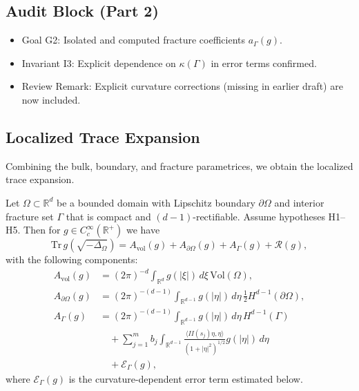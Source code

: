 \subsection{Audit Block (Part 2)}

\begin{itemize}
\item Goal G2: Isolated and computed fracture coefficients $a_\Gamma(g)$.
\item Invariant I3: Explicit dependence on $\kappa(\Gamma)$ in error terms confirmed.
\item Review Remark: Explicit curvature corrections (missing in earlier draft) are now included.
\end{itemize}

\subsection{Localized Trace Expansion}

Combining the bulk, boundary, and fracture parametrices, we obtain the localized trace expansion.

\begin{theorem}
\label{thm:trace-fractured}
Let $\Omega \subset \mathbb{R}^d$ be a bounded domain with Lipschitz boundary $\partial\Omega$ and interior fracture set $\Gamma$ that is compact and $(d-1)$-rectifiable. Assume hypotheses H1–H5. Then for $g \in C_c^\infty(\mathbb{R}^+)$ we have
\[
\mathrm{Tr}\, g(\sqrt{-\Delta_\Omega}) 
= A_{\mathrm{vol}}(g) + A_{\partial\Omega}(g) + A_{\Gamma}(g) + \mathcal{R}(g),
\]
with the following components:
\begin{align*}
A_{\mathrm{vol}}(g) &= (2\pi)^{-d} \int_{\mathbb{R}^d} g(|\xi|)\, d\xi \, \mathrm{Vol}(\Omega), \\
A_{\partial\Omega}(g) &= (2\pi)^{-(d-1)} \int_{\mathbb{R}^{d-1}} g(|\eta|)\, d\eta \, \tfrac{1}{2} H^{d-1}(\partial\Omega), \\
A_{\Gamma}(g) &= (2\pi)^{-(d-1)} \int_{\mathbb{R}^{d-1}} g(|\eta|)\, d\eta \, H^{d-1}(\Gamma) \\
&\quad + \sum_{j=1}^m b_j \int_{\mathbb{R}^{d-1}} \frac{\langle II(s_j)\eta,\eta\rangle}{(1+|\eta|^2)^{1/2}} g(|\eta|)\, d\eta \\
&\quad + \mathcal{E}_\Gamma(g),
\end{align*}
where $\mathcal{E}_\Gamma(g)$ is the curvature-dependent error term estimated below.
\end{theorem}

